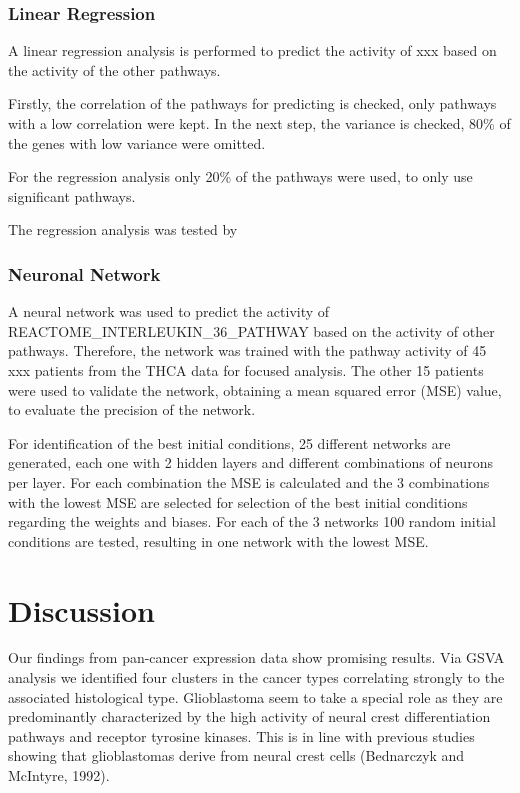 \documentclass[
  parskip,
  oneside]{scrreprt}
\begin{document}
\hypertarget{linear-regression}{%
\subsection{Linear Regression}\label{linear-regression}}

A linear regression analysis is performed to predict the activity of xxx
based on the activity of the other pathways.

Firstly, the correlation of the pathways for predicting is checked, only
pathways with a low correlation were kept. In the next step, the
variance is checked, 80\% of the genes with low variance were omitted.

For the regression analysis only 20\% of the pathways were used, to only
use significant pathways.

The regression analysis was tested by

\hypertarget{neuronal-network}{%
\subsection{Neuronal Network}\label{neuronal-network}}

A neural network was used to predict the activity of
REACTOME\_INTERLEUKIN\_36\_PATHWAY based on the activity of other
pathways. Therefore, the network was trained with the pathway activity
of 45 xxx patients from the THCA data for focused analysis. The other 15
patients were used to validate the network, obtaining a mean squared
error (MSE) value, to evaluate the precision of the network.

For identification of the best initial conditions, 25 different networks
are generated, each one with 2 hidden layers and different combinations
of neurons per layer. For each combination the MSE is calculated and the
3 combinations with the lowest MSE are selected for selection of the
best initial conditions regarding the weights and biases. For each of
the 3 networks 100 random initial conditions are tested, resulting in
one network with the lowest MSE.

\hypertarget{discussion}{%
\chapter{Discussion}\label{discussion}}

Our findings from pan-cancer expression data show promising results. Via
GSVA analysis we identified four clusters in the cancer types
correlating strongly to the associated histological type. Glioblastoma
seem to take a special role as they are predominantly characterized by
the high activity of neural crest differentiation pathways and receptor
tyrosine kinases. This is in line with previous studies showing that
glioblastomas derive from neural crest cells (Bednarczyk and McIntyre,
1992).
\end{document}
